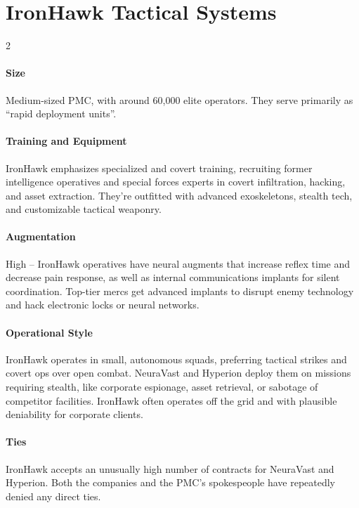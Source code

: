 \section*{IronHawk Tactical Systems}
\vspace{5mm}
\begin{multicols}{2}
\paragraph{Size}
Medium-sized PMC, with around 60,000 elite operators. They serve primarily as “rapid deployment units”.
\paragraph{Training and Equipment}
IronHawk emphasizes specialized and covert training, recruiting former intelligence operatives and special forces experts in covert infiltration, hacking, and asset extraction. They’re outfitted with advanced exoskeletons, stealth tech, and customizable tactical weaponry.
\paragraph{Augmentation}
High – IronHawk operatives have neural augments that increase reflex time and decrease pain response, as well as internal communications implants for silent coordination. Top-tier mercs get advanced implants to disrupt enemy technology and hack electronic locks or neural networks.
\paragraph{Operational Style}
IronHawk operates in small, autonomous squads, preferring tactical strikes and covert ops over open combat. NeuraVast and Hyperion deploy them on missions requiring stealth, like corporate espionage, asset retrieval, or sabotage of competitor facilities. IronHawk often operates off the grid and with plausible deniability for corporate clients.
\paragraph{Ties}
IronHawk accepts an unusually high number of contracts for NeuraVast and Hyperion.
Both the companies and the PMC's spokespeople have repeatedly denied any direct ties.
\end{multicols}

